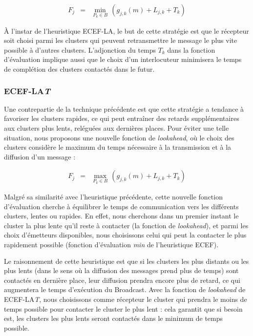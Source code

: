 \begin{eqnarray*}
	F_{j} & = & \min_{P_{k}\in B}\,(g_{j,k}(m)+L_{j,k}+T_{k})\end{eqnarray*}


À l'instar de l'heuristique ECEF-LA, le but de cette stratégie est
que le récepteur soit choisi parmi les  clusters qui peuvent retransmettre
le message le plus vite possible à d'autres  clusters. L'adjonction
du temps $T_{k}$ dans la fonction d'évaluation implique aussi que
le choix d'un interlocuteur minimisera le temps de complétion des
 clusters contactés dans le futur. 


\subsubsection*{ECEF-LA\emph{T}}

Une contrepartie de la technique précédente est que cette stratégie
a tendance à favoriser les  clusters rapides, ce qui peut entraîner
des retards supplémentaires aux  clusters plus lents, reléguées aux
dernières places. Pour éviter une telle situation, nous proposons
une nouvelle fonction de \emph{lookahead}, où le choix des  clusters
considère le maximum du temps nécessaire à la transmission et à la
diffusion d'un message : 

\begin{eqnarray*}
	F_{j} & = & \max_{P_{k}\in B}\,(g_{j,k}(m)+L_{j,k}+T_{k})\end{eqnarray*}


Malgré sa similarité avec l'heuristique précédente, cette nouvelle
fonction d'évaluation cherche à équilibrer le temps de communication
vers les différents  clusters, lentes ou rapides. En effet, nous cherchons
dans un premier instant le  cluster la plus lente qu'il reste à contacter
(la fonction de \emph{lookahead}), et parmi les choix d'émetteurs
disponibles, nous choisissons celui qui peut la contacter le plus
rapidement possible (fonction d'évaluation \emph{min} de l'heuristique
ECEF).

Le raisonnement de cette heuristique est que si les  clusters les plus
distants ou les plus lents (dans le sens où la diffusion des messages
prend plus de temps) sont contactés en dernière place, leur diffusion
prendra encore plus de retard, ce qui augmentera le temps d'exécution
du Broadcast. Avec la fonction de \emph{lookahead} de ECEF-LA\emph{T},
nous choisissons comme récepteur le  cluster qui prendra le moins de
temps possible pour contacter le  cluster le plus lent : cela garantit
que si besoin est, les  clusters les plus lents seront contactés dans
le minimum de temps possible.


